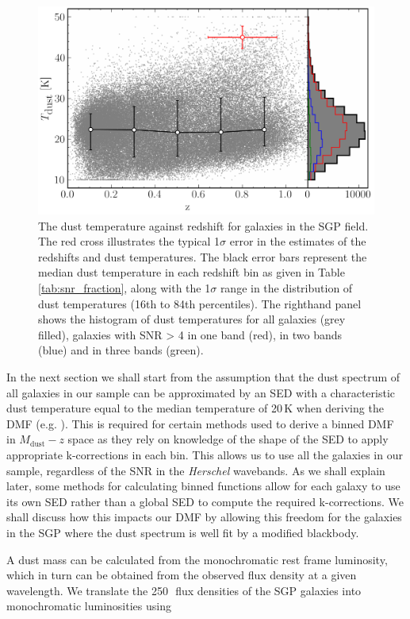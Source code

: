 \begin{figure}
	\centering
	\includegraphics[width=0.75\columnwidth]{Figures/dust_temperatures.pdf}
	\caption[The distribution of dust temperatures as a function of redshift]{The dust temperature against redshift for galaxies in the SGP field. The red cross illustrates the typical 1$\sigma$ error in the estimates of the redshifts and dust temperatures. The black error bars represent the median dust temperature in each redshift bin as given in Table \ref{tab:snr_fraction}, along with the 1$\sigma$ range in the distribution of dust temperatures (16th to 84th percentiles). The righthand panel shows the histogram of dust temperatures for all galaxies (grey filled), galaxies with SNR > 4 in one band (red), in two bands (blue) and in three bands (green).}
	\label{fig:dust_temperatures}
\end{figure}

In the next section we shall start from the assumption that the dust spectrum of all galaxies in our sample can be approximated by an SED with a characteristic dust temperature equal to the median temperature of 20\,K when deriving the DMF (e.g. \citealt{Vlahakis_2005}). This is required for certain methods used to derive a binned DMF in $M_{\textrm{dust}}-z$ space as they rely on knowledge of the shape of the SED to apply appropriate k-corrections in each bin. This allows us to use all the galaxies in our sample, regardless of the SNR in the \textit{Herschel} wavebands. As we shall explain later, some methods for calculating binned functions allow for each galaxy to use its own SED rather than a global SED to compute the required k-corrections. We shall discuss how this impacts our DMF by allowing this freedom for the galaxies in the SGP where the dust spectrum is well fit by a modified blackbody.

A dust mass can be calculated from the monochromatic rest frame luminosity, which in turn can be obtained from the observed flux density at a given wavelength. We translate the 250\,\micron\ flux densities of the SGP galaxies into monochromatic luminosities using

